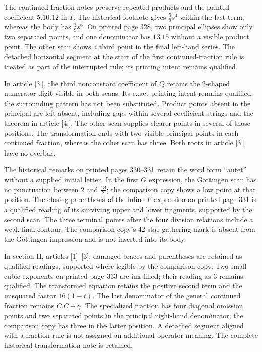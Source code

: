 The continued-fraction notes preserve repeated products and the printed coefficient $5\mathord{.}10\mathord{.}12$ in $T$. The historical footnote gives $\frac59s^4$ within the last term, whereas the body has $\frac39s^6$. On printed page 328, two principal ellipses show only two separated points, and one denominator has $13\ 15$ without a visible product point. The other scan shows a third point in the final left-hand series. The detached horizontal segment at the start of the first continued-fraction rule is treated as part of the interrupted rule; its printing intent remains qualified.

In article [3.], the third nonconstant coefficient of $Q$ retains the $2$-shaped numerator digit visible in both scans. Its exact printing intent remains qualified; the surrounding pattern has not been substituted. Product points absent in the principal are left absent, including gaps within several coefficient strings and the theorem in article [4.]. The other scan supplies clearer points in several of those positions. The transformation ends with two visible principal points in each continued fraction, whereas the other scan has three. Both roots in article [3.] have no overbar.

\par The historical remarks on printed pages 330–331 retain the word form ``autet'' without a supplied initial letter. In the first $G$ expression, the Göttingen scan has no punctuation between $2$ and $\frac{13}{2}$; the comparison copy shows a low point at that position. The closing parenthesis of the inline $F$ expression on printed page 331 is a qualified reading of its surviving upper and lower fragments, supported by the second scan. The three terminal points after the four division relations include a weak final contour. The comparison copy’s 42-star gathering mark is absent from the Göttingen impression and is not inserted into its body.

\par In section II, articles [1]–[3], damaged braces and parentheses are retained as qualified readings, supported where legible by the comparison copy. Two small cubic exponents on printed page 333 are ink-filled; their reading as $3$ remains qualified. The transformed equation retains the positive second term and the unsquared factor $16(1-t)$. The last denominator of the general continued fraction remains $C.C+\gamma$. The specialized fraction has four diagonal omission points and two separated points in the principal right-hand denominator; the comparison copy has three in the latter position. A detached segment aligned with a fraction rule is not assigned an additional operator meaning. The complete historical transformation note is retained.

